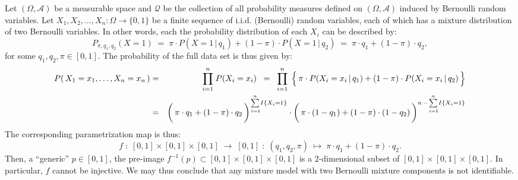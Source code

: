 \begin{example}
\mbox{}\vskip 0.05cm
\noindent
Let $\left(\Omega,\mathcal{A}\right)$ be a measurable space
and $\mathcal{Q}$ be the collection of all probability measures
defined on $\left(\Omega,\mathcal{A}\right)$ induced by Bernoulli random variables.
Let $X_{1}, X_{2}, \ldots, X_{n} : \Omega \longrightarrow \{0,1\}$
be a finite sequence of i.i.d. (Bernoulli) random variables,
each of which has a mixture distribution of two Bernoulli variables.
In other words, each the probability distribution of each $X_{i}$ can be described by:
\begin{equation*}
P_{\pi,q_{1},q_{2}}(X = 1)
\;=\; \pi \cdot P(X=1\,\vert\,q_{1}) + (1-\pi)\cdot P(X=1\,\vert\,q_{2})
\;=\; \pi \cdot q_{1} + (1-\pi)\cdot q_{2},
\end{equation*}
for some $q_{1}, q_{2},\pi \in [0,1]$.
The probability of the full data set is thus given by:
\begin{eqnarray*}
P\!\left(\,X_{1} = x_{1},\ldots,X_{n}=x_{n}\,\right)
& = & \overset{n}{\underset{i=1}{\prod}}\;P(X_{i}=x_{i})
\;\; = \;\; \overset{n}{\underset{i=1}{\prod}}\;
	\left\{\,
		\pi \cdot P(X_{i}=x_{i}\,\vert\,q_{1})
		\overset{{\color{white}.}}{+}
		(1-\pi)\cdot P(X_{i}=x_{i}\,\vert\,q_{2})
	\,\right\}
\\
&=&
	\left(\,
		\pi \cdot q_{1}
		\overset{{\color{white}|}}{+}
		(1-\pi)\cdot q_{2}
	\,\right)^{\overset{n}{\underset{\mbox{}\,i=1}{\sum}}I\{X_{i}=1\}}
	\cdot
	\left(\,
		\pi \cdot (1-q_{1})
		\overset{{\color{white}|}}{+}
		(1-\pi)\cdot (1-q_{2})
	\,\right)^{n\,- \overset{n}{\underset{\mbox{}\,i=1}{\sum}}I\{X_{i}=1\}}
\end{eqnarray*}
The corresponding parametrization map is thus:
\begin{equation*}
f \;:\; [0,1] \times [0,1] \times [0,1] \;\longrightarrow\; [0,1]
\;:\; (q_{1},q_{2},\pi) \;\longmapsto\; \pi \cdot q_{1} + (1-\pi)\cdot q_{2}.
\end{equation*}
Then, a ``generic'' $p \in [0,1]$, the pre-image
$f^{-1}(p) \subset [0,1] \times [0,1] \times [0,1]$
is a $2$-dimensional subset of $[0,1] \times [0,1] \times [0,1]$.
In particular, $f$ cannot be injective.
We may thus conclude that any mixture model with two
Bernoulli mixture components is not identifiable.
\end{example}

